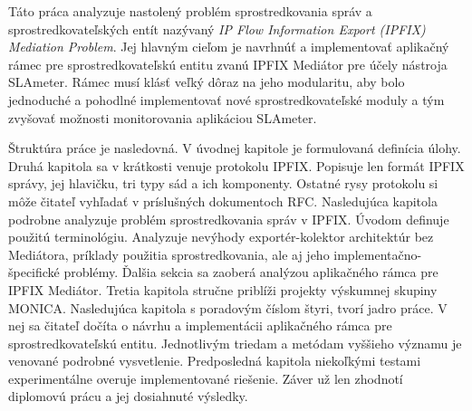 Táto práca analyzuje nastolený problém sprostredkovania správ a sprostredkovateľských entít nazývaný 
\emph{IP Flow Information Export (IPFIX) Mediation Problem}. Jej hlavným cieľom je navrhnúť a implementovať
aplikačný rámec pre sprostredkovateľskú entitu zvanú IPFIX Mediátor pre účely nástroja SLAmeter. 
Rámec musí klásť veľký dôraz na jeho modularitu, aby bolo jednoduché a pohodlné implementovať nové 
sprostredkovateľské moduly a tým zvyšovať možnosti monitorovania aplikáciou SLAmeter.

Štruktúra práce je nasledovná. V úvodnej kapitole je formulovaná definícia úlohy. Druhá kapitola sa 
v krátkosti venuje protokolu IPFIX. Popisuje len formát IPFIX správy, jej hlavičku, tri typy
sád a ich komponenty. Ostatné rysy protokolu si môže čitateľ vyhľadať v príslušných dokumentoch RFC.
Nasledujúca kapitola podrobne analyzuje problém sprostredkovania správ v IPFIX. Úvodom definuje použitú 
terminológiu. Analyzuje nevýhody exportér-kolektor architektúr bez Mediátora, príklady použitia 
sprostredkovania, ale aj jeho implementačno-špecifické problémy. Ďalšia sekcia sa zaoberá analýzou 
aplikačného rámca pre IPFIX Mediátor. Tretia kapitola stručne priblíži projekty výskumnej skupiny MONICA.
Nasledujúca kapitola s poradovým číslom štyri, tvorí jadro práce. V nej sa čitateľ dočíta o návrhu a 
implementácii aplikačného rámca pre sprostredkovateľskú entitu. Jednotlivým triedam a metódam vyššieho 
významu je venované podrobné vysvetlenie. Predposledná kapitola niekoľkými testami experimentálne 
overuje implementované riešenie. Záver už len zhodnotí diplomovú prácu a jej dosiahnuté výsledky. 



